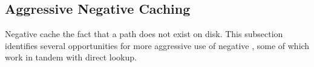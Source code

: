 






\subsection{Aggressive Negative Caching}

Negative \dentries{} cache the fact that a path does not exist on disk.
This subsection identifies several 
opportunities for more aggressive use of negative \dentries{},
some of which work in tandem with direct lookup.


